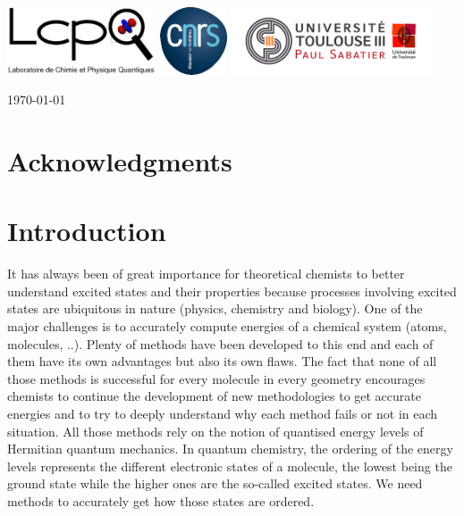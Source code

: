 \documentclass[11pt,a4paper]{article}
\begin{document}
\begin{center}
\vspace{0.5cm}
\includegraphics[height=2cm]{LCPQ_logo.pdf} \hfill \includegraphics[height=2cm]{LogoCNRS.eps} \hfill \includegraphics[height=2cm]{UPS_logo.jpg}

\end{center}

\vfill
\hfill \today

\newpage

\setlength{\parindent}{17pt}

\section*{Acknowledgments}

\tableofcontents

\newpage

\section{Introduction}

It has always been of great importance for theoretical chemists to better understand excited states and their properties because processes involving excited states are ubiquitous in nature (physics, chemistry and biology). One of the major challenges is to accurately compute energies of a chemical system (atoms, molecules, ..). Plenty of methods have been developed to this end and each of them have its own advantages but also its own flaws. The fact that none of all those methods is successful for every molecule in every geometry encourages chemists to continue the development of new methodologies to get accurate energies and to try to deeply understand why each method fails or not in each situation. All those methods rely on the notion of quantised energy levels of Hermitian quantum mechanics. In quantum chemistry, the ordering of the energy levels represents the different electronic states of a molecule, the lowest being the ground state while the higher ones are the so-called excited states. We need methods to accurately get how those states are ordered.
\end{document}
